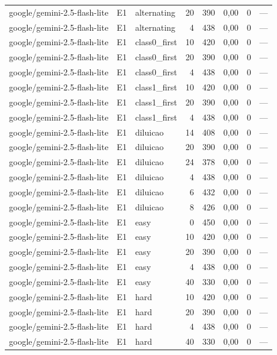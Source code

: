 \begin{table}[htbp]
\begin{tabular}{lllrrrrr}
google/gemini-2.5-flash-lite & E1 & alternating & 20 & 390 & 0,00 & 0 & — \\
google/gemini-2.5-flash-lite & E1 & alternating & 4 & 438 & 0,00 & 0 & — \\
google/gemini-2.5-flash-lite & E1 & class0\_first & 10 & 420 & 0,00 & 0 & — \\
google/gemini-2.5-flash-lite & E1 & class0\_first & 20 & 390 & 0,00 & 0 & — \\
google/gemini-2.5-flash-lite & E1 & class0\_first & 4 & 438 & 0,00 & 0 & — \\
google/gemini-2.5-flash-lite & E1 & class1\_first & 10 & 420 & 0,00 & 0 & — \\
google/gemini-2.5-flash-lite & E1 & class1\_first & 20 & 390 & 0,00 & 0 & — \\
google/gemini-2.5-flash-lite & E1 & class1\_first & 4 & 438 & 0,00 & 0 & — \\
google/gemini-2.5-flash-lite & E1 & diluicao & 14 & 408 & 0,00 & 0 & — \\
google/gemini-2.5-flash-lite & E1 & diluicao & 20 & 390 & 0,00 & 0 & — \\
google/gemini-2.5-flash-lite & E1 & diluicao & 24 & 378 & 0,00 & 0 & — \\
google/gemini-2.5-flash-lite & E1 & diluicao & 4 & 438 & 0,00 & 0 & — \\
google/gemini-2.5-flash-lite & E1 & diluicao & 6 & 432 & 0,00 & 0 & — \\
google/gemini-2.5-flash-lite & E1 & diluicao & 8 & 426 & 0,00 & 0 & — \\
google/gemini-2.5-flash-lite & E1 & easy & 0 & 450 & 0,00 & 0 & — \\
google/gemini-2.5-flash-lite & E1 & easy & 10 & 420 & 0,00 & 0 & — \\
google/gemini-2.5-flash-lite & E1 & easy & 20 & 390 & 0,00 & 0 & — \\
google/gemini-2.5-flash-lite & E1 & easy & 4 & 438 & 0,00 & 0 & — \\
google/gemini-2.5-flash-lite & E1 & easy & 40 & 330 & 0,00 & 0 & — \\
google/gemini-2.5-flash-lite & E1 & hard & 10 & 420 & 0,00 & 0 & — \\
google/gemini-2.5-flash-lite & E1 & hard & 20 & 390 & 0,00 & 0 & — \\
google/gemini-2.5-flash-lite & E1 & hard & 4 & 438 & 0,00 & 0 & — \\
google/gemini-2.5-flash-lite & E1 & hard & 40 & 330 & 0,00 & 0 & — \\

\end{tabular}
\end{table}
